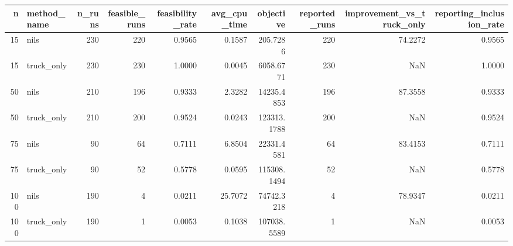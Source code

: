 \begin{tabular}{rlrrrrrrrr}
\toprule
n & method_name & n_runs & feasible_runs & feasibility_rate & avg_cpu_time & objective & reported_runs & improvement_vs_truck_only & reporting_inclusion_rate \\
\midrule
15 & nils & 230 & 220 & 0.9565 & 0.1587 & 205.7286 & 220 & 74.2272 & 0.9565 \\
15 & truck_only & 230 & 230 & 1.0000 & 0.0045 & 6058.6771 & 230 & NaN & 1.0000 \\
50 & nils & 210 & 196 & 0.9333 & 2.3282 & 14235.4853 & 196 & 87.3558 & 0.9333 \\
50 & truck_only & 210 & 200 & 0.9524 & 0.0243 & 123313.1788 & 200 & NaN & 0.9524 \\
75 & nils & 90 & 64 & 0.7111 & 6.8504 & 22331.4581 & 64 & 83.4153 & 0.7111 \\
75 & truck_only & 90 & 52 & 0.5778 & 0.0595 & 115308.1494 & 52 & NaN & 0.5778 \\
100 & nils & 190 & 4 & 0.0211 & 25.7072 & 74742.3218 & 4 & 78.9347 & 0.0211 \\
100 & truck_only & 190 & 1 & 0.0053 & 0.1038 & 107038.5589 & 1 & NaN & 0.0053 \\
\bottomrule
\end{tabular}
